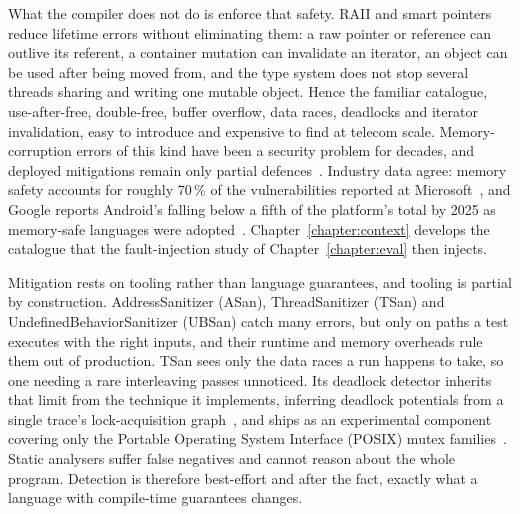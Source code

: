 What the compiler does not do is enforce that safety. RAII and smart pointers reduce lifetime
errors without eliminating them: a raw pointer or reference can outlive its referent, a container
mutation can invalidate an iterator, an object can be used after being moved from, and the type
system does not stop several threads sharing and writing one mutable object. Hence the familiar
catalogue, use-after-free, double-free, buffer overflow, data races, deadlocks and iterator
invalidation, easy to introduce and expensive to find at telecom scale. Memory-corruption errors
of this kind have been a security problem for decades, and deployed mitigations remain only
partial defences~\cite{szekeres2013sok}. Industry data agree: memory safety accounts for roughly
70\,\% of the vulnerabilities reported at Microsoft~\cite{msrc2019memory}, and Google reports
Android's falling below a fifth of the platform's total by 2025 as memory-safe languages were
adopted~\cite{google2022android,vanderstoep2025android}. Chapter~\ref{chapter:context} develops
the catalogue that the fault-injection study of Chapter~\ref{chapter:eval} then injects.

Mitigation rests on tooling rather than language guarantees, and tooling is partial by
construction. AddressSanitizer (ASan), ThreadSanitizer (TSan) and UndefinedBehaviorSanitizer
(UBSan) catch many errors, but only on paths a test executes with the right inputs, and their
runtime and memory overheads rule them out of production. TSan sees only the data races a run
happens to take, so one needing a rare interleaving passes unnoticed. Its deadlock detector
inherits that limit from the technique it implements, inferring deadlock potentials from a single
trace's lock-acquisition graph~\cite{bensalem2005deadlock}, and ships as an experimental component
covering only the Portable Operating System Interface (POSIX) mutex
families~\cite{tsandeadlock}. Static analysers suffer false negatives and cannot reason about the
whole program. Detection is therefore best-effort and after the fact, exactly what a language with
compile-time guarantees changes.

